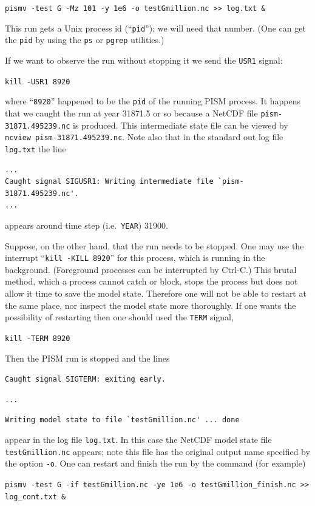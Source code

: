 \documentclass[11pt,final]{amsart}
\begin{document}
\verb|pismv -test G -Mz 101 -y 1e6 -o testGmillion.nc >> log.txt &|

\noindent This run gets a Unix process id (``\verb|pid|''); we will need that number.  (One can get the \verb|pid| by using the \verb|ps| or \verb|pgrep| utilities.)

If we want to observe the run without stopping it we send the \verb|USR1| signal:

\verb|kill -USR1 8920|

\noindent where ``\verb|8920|'' happened to be the \verb|pid| of the running PISM process.  It happens that we caught the run at year 31871.5 or so because a NetCDF file \verb|pism-31871.495239.nc| is produced.  This intermediate state file can be viewed by \verb|ncview pism-31871.495239.nc|.  Note also that in the standard out log file \verb|log.txt| the line

\begin{verbatim}
...
Caught signal SIGUSR1: Writing intermediate file `pism-31871.495239.nc'.
...
\end{verbatim}
\noindent appears around time step (i.e.~\verb|YEAR|) 31900.

Suppose, on the other hand, that the run needs to be stopped.  One may use the interrupt ``\verb|kill -KILL 8920|'' for this process, which is running in the background.  (Foreground processes can be interrupted by Ctrl-C.)  This brutal method, which a process cannot catch or block, stops the process but does not allow it  time to save the model state.  Therefore one will not be able to restart at the same place, nor inspect the model state more thoroughly.  If one wants the possibility of restarting then one should used the \verb|TERM| signal,

\verb|kill -TERM 8920|

\noindent Then the PISM run is stopped and the lines

\verb|Caught signal SIGTERM: exiting early.|

\verb|...|

\verb|Writing model state to file `testGmillion.nc' ... done|

\noindent appear in the log file \verb|log.txt|.  In this case the NetCDF model state file \verb|testGmillion.nc| appears; note this file has the original output name specified by the option \verb|-o|.  One can restart and finish the run by the command (for example)

\verb|pismv -test G -if testGmillion.nc -ye 1e6 -o testGmillion_finish.nc >> log_cont.txt &|
\smallskip
\end{document}
